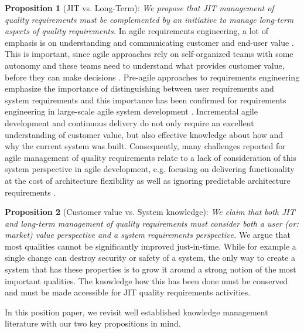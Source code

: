\textbf{Proposition 1} (JIT vs. Long-Term): \emph{We propose that JIT management of quality requirements must be complemented by an initiative to manage long-term aspects of quality requirements.}
%
%
In agile requirements engineering, a lot of emphasis is on understanding and communicating customer and end-user value \cite{Alahyari2016}.
This is important, since agile approaches rely on self-organized teams with some autonomy \cite{Meyer2014} and these teams need to understand what provides customer value, before they can make decisions \cite{Kasauli2017}.
Pre-agile approaches to requirements engineering emphasize the importance of distinguishing between user requirements and system requirements \cite{Sommerville2006} and this importance has been confirmed for requirements engineering in large-scale agile system development \cite{Kasauli2017a}. Incremental agile development and continuous delivery do not only require an excellent understanding of customer value, but also effective knowledge about how and why the current system was built. 
Consequently, many challenges reported for agile management of quality requirements relate to a lack of consideration of this system perspective in agile development, e.g. %
{focusing on delivering functionality at the cost of architecture flexibility} as well as %
{ignoring predictable architecture requirements} \cite{Alsaqaf2017}. 

\textbf{Proposition 2} (Customer value vs. System knowledge): \emph{ We claim that both JIT and long-term management of quality requirements must consider both a user (or: market) value perspective and a system requirements perspective.}
%
We argue that most qualities cannot be significantly improved just-in-time. 
While for example a single change can destroy security or safety of a system, the only way to create a system that has these properties is to grow it around a strong notion of the most important qualities. 
The knowledge how this has been done must be conserved and must be made accessible for JIT quality requirements activities.

In this position paper, we revisit well established knowledge management literature with our two key propositions in mind.
 


%
